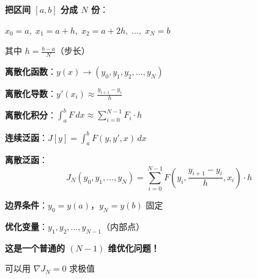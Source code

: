\documentclass[12pt, a4paper]{ctexart}
\begin{document}
\begin{blackboard}[离散化设置]

\textbf{把区间 $[a, b]$ 分成 $N$ 份}：

$x_0 = a, \; x_1 = a + h, \; x_2 = a + 2h, \; \ldots, \; x_N = b$

其中 $h = \frac{b - a}{N}$（步长）

\textbf{离散化函数}：$y(x) \to (y_0, y_1, y_2, \ldots, y_N)$

\textbf{离散化导数}：$y'(x_i) \approx \frac{y_{i+1} - y_i}{h}$

\textbf{离散化积分}：$\int_a^b F \, dx \approx \sum_{i=0}^{N-1} F_i \cdot h$

\begin{center}
\end{center}

\end{blackboard}

\begin{blackboard}[离散化泛函]

\textbf{连续泛函}：$J[y] = \int_a^b F(y, y', x) \, dx$

\textbf{离散泛函}：
\[
J_N(y_0, y_1, \ldots, y_N) = \sum_{i=0}^{N-1} F\left( y_i, \frac{y_{i+1} - y_i}{h}, x_i \right) \cdot h
\]

\textbf{边界条件}：$y_0 = y(a)$，$y_N = y(b)$ 固定

\textbf{优化变量}：$y_1, y_2, \ldots, y_{N-1}$（内部点）

\textbf{这是一个普通的 $(N-1)$ 维优化问题！}

可以用 $\nabla J_N = 0$ 求极值

\end{blackboard}
\end{document}
